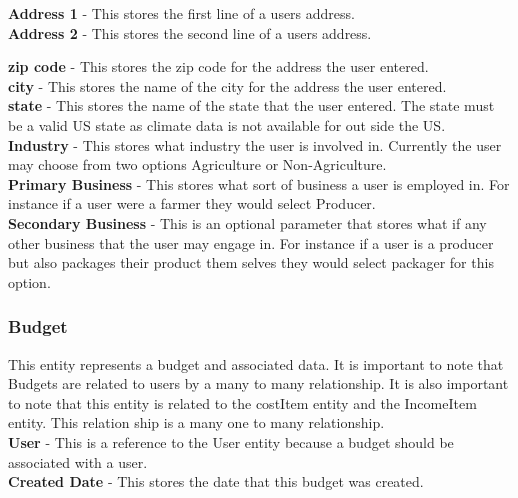 \documentclass[onecolumn, draftclsnofoot,10pt, compsoc]{article}
\begin{document}
				\textbf{Address 1} - This  stores the first line of a users address.\\
				
				\textbf{Address 2} - This stores the second line of a users address.
				
				\textbf{zip code} - This stores the zip code for the address the user entered.\\
				
				\textbf{city} - This stores the name of the city for the address the user entered.\\
				
				\textbf{state} - This stores the name of the state that the user entered. The state must be a valid US state as climate data is not available for out side the US.\\
				
				\textbf{Industry} - This stores what industry the user is involved in. Currently the user may choose from two options Agriculture or Non-Agriculture.\\
				
				\textbf{Primary Business} - This stores what sort of business a user is employed in. For instance if a user were a farmer they would select Producer.\\
				
				\textbf{Secondary Business} - This is an optional parameter that stores what if any other business that the user may engage in. For instance if a user is a producer but also packages their product them selves they would select packager for this option.\\
				
			\subsubsection{Budget}
				This entity represents a budget and associated data. It is important to note that Budgets are related to users by a many to many relationship. It is also important to note that this entity is related to the costItem entity and the IncomeItem entity. This relation ship is a many one to many relationship.\\
				\textbf{User} - This is a reference to the User entity because a budget should be associated with a user.\\
				
				\textbf{Created Date} - This stores the date that this budget was created.\\
				
\end{document}
